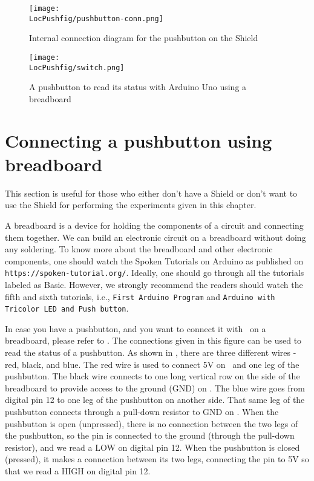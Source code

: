 \begin{figure}
\centering
\texttt{[image: \\LocPushfig/pushbutton-conn.png]}
\caption{Internal connection diagram for the pushbutton on the Shield}
\label{fig:pushbuttonconn}
\end{figure}


\begin{figure}
  \centering
  \texttt{[image: \\LocPushfig/switch.png]}
  \caption{A pushbutton to read its status with Arduino Uno using a breadboard}
  \label{fig:switch-bread}
\end{figure}

\section{Connecting a pushbutton using breadboard}
This section is useful for those who either don't have a Shield or don't want to use the Shield
for performing the experiments given in this chapter.

A breadboard is a device for holding the components of a circuit and connecting 
them together. We can build an electronic circuit on a breadboard without doing any 
soldering. To know more about the breadboard and other electronic components, 
one should watch the Spoken Tutorials on Arduino as published on
{\tt https://spoken-tutorial.org/}. Ideally, one should go through all the
tutorials labeled as Basic. However, we strongly recommend the readers should
watch the fifth and sixth tutorials, i.e., {\tt First Arduino Program} and 
{\tt Arduino with Tricolor LED and Push button}.

In case you have a pushbutton, and you want to connect it with \arduino\ on a breadboard, 
please refer to . The connections given in this figure can be used to 
read the status of a pushbutton. As shown in , 
there are three different wires - red, black, and blue. The red wire is used to connect 5V on 
\arduino\ and one leg of the pushbutton. The black wire connects to one long vertical row on 
the side of the breadboard to provide access to the ground (GND) on \arduino. 
The blue wire goes from digital pin 12 to one leg of the pushbutton on another side. 
That same leg of the pushbutton connects through a pull-down resistor to GND on \arduino. 
When the pushbutton is open (unpressed), there is no connection between the two legs of the pushbutton, 
so the pin is connected to the ground (through the pull-down resistor), and we read a LOW on
digital pin 12. When the pushbutton is closed (pressed), it makes a connection between its two legs, 
connecting the pin to 5V so that we read a HIGH on digital pin 12. 

